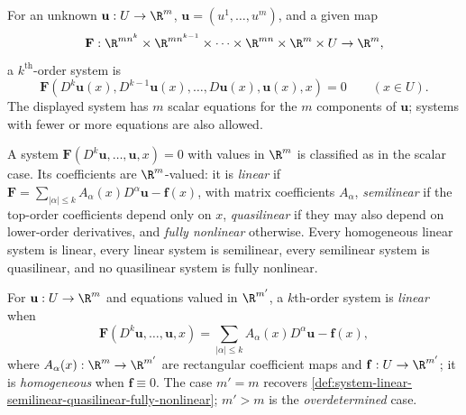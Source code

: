 \begin{definition}
\label{def:kth-order-system-pde}
\leanok
For an unknown $\mathbf{u}:U\to\R^m$, $\mathbf{u}=(u^1,\ldots,u^m)$, and a given map
$$\mathbf{F} : \R^{mn^k} \times \R^{mn^{k-1}} \times \cdots \times \R^{mn} \times \R^m \times U \to \R^m,$$
a $k^{\text{th}}$-order system is
\begin{equation}
\mathbf{F}(D^k \mathbf{u}(x), D^{k-1}\mathbf{u}(x), \ldots, D\mathbf{u}(x), \mathbf{u}(x), x) = 0 \qquad (x \in U).
\tag{2}
\end{equation}
The displayed system has $m$ scalar equations for the $m$ components of $\mathbf{u}$; systems with fewer or more equations are also allowed.
\end{definition}

\begin{definition}
\label{def:system-linear-semilinear-quasilinear-fully-nonlinear}
\leanok
A system $\mathbf{F}(D^k\mathbf{u}, \ldots, \mathbf{u}, x)=0$ with values in $\R^m$ is classified as in the scalar case. Its coefficients are $\R^m$-valued: it is \emph{linear} if $\mathbf{F} = \sum_{|\alpha|\le k} A_\alpha(x) D^\alpha\mathbf{u} - \mathbf{f}(x)$, with matrix coefficients $A_\alpha$, \emph{semilinear} if the top-order coefficients depend only on $x$, \emph{quasilinear} if they may also depend on lower-order derivatives, and \emph{fully nonlinear} otherwise. Every homogeneous linear system is linear, every linear system is semilinear, every semilinear system is quasilinear, and no quasilinear system is fully nonlinear.
\end{definition}

\begin{definition}
\label{def:non-square-linear-system}
\leanok
For $\mathbf{u}:U\to\R^m$ and equations valued in $\R^{m'}$, a $k$th-order system is \emph{linear} when
$$\mathbf{F}(D^k\mathbf{u}, \ldots, \mathbf{u}, x) = \sum_{|\alpha|\le k} A_\alpha(x) D^\alpha\mathbf{u} - \mathbf{f}(x),$$
where $A_\alpha(x):\R^m\to\R^{m'}$ are rectangular coefficient maps and $\mathbf{f}:U\to\R^{m'}$; it is \emph{homogeneous} when $\mathbf{f}\equiv0$. The case $m'=m$ recovers \cref{def:system-linear-semilinear-quasilinear-fully-nonlinear}; $m'>m$ is the \emph{overdetermined} case.
\end{definition}

